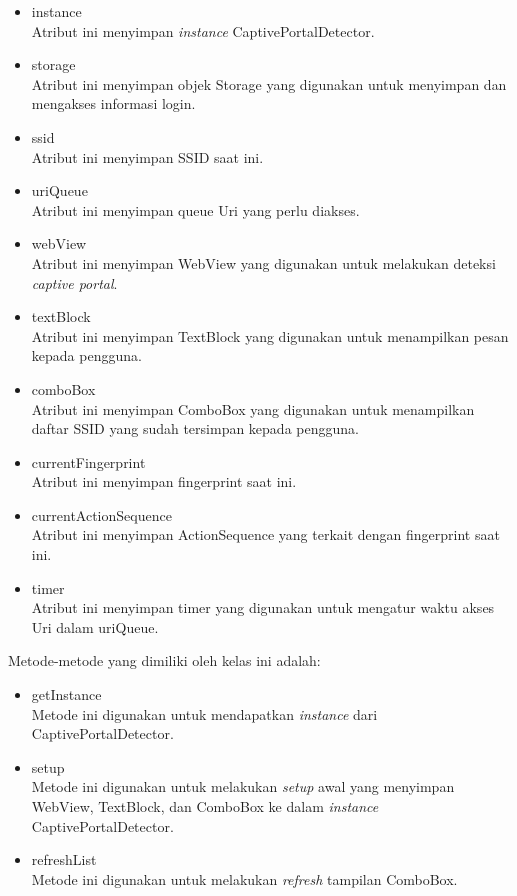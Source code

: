 \begin{itemize}
{        \begin{itemize}
            \item{instance\\Atribut ini menyimpan \textit{instance} CaptivePortalDetector.}
            \item{storage\\Atribut ini menyimpan objek Storage yang digunakan untuk menyimpan dan mengakses informasi login.}
            \item{ssid\\Atribut ini menyimpan SSID saat ini.}
            \item{uriQueue\\Atribut ini menyimpan queue Uri yang perlu diakses.}
            \item{webView\\Atribut ini menyimpan WebView yang digunakan untuk melakukan deteksi \textit{captive portal}.}
            \item{textBlock\\Atribut ini menyimpan TextBlock yang digunakan untuk menampilkan pesan kepada pengguna.}
            \item{comboBox\\Atribut ini menyimpan ComboBox yang digunakan untuk menampilkan daftar SSID yang sudah tersimpan kepada pengguna.}
            \item{currentFingerprint\\Atribut ini menyimpan fingerprint saat ini.}
            \item{currentActionSequence\\Atribut ini menyimpan ActionSequence yang terkait dengan fingerprint saat ini.}
            \item{timer\\Atribut ini menyimpan timer yang digunakan untuk mengatur waktu akses Uri dalam uriQueue.}
        \end{itemize}
        Metode-metode yang dimiliki oleh kelas ini adalah:
        \begin{itemize}
            \item{getInstance\\Metode ini digunakan untuk mendapatkan \textit{instance} dari CaptivePortalDetector.}
            \item{setup\\Metode ini digunakan untuk melakukan \textit{setup} awal yang menyimpan WebView, TextBlock, dan ComboBox ke dalam \textit{instance} CaptivePortalDetector.}
            \item{refreshList\\Metode ini digunakan untuk melakukan \textit{refresh} tampilan ComboBox.}

\end{itemize}}
\end{itemize}
